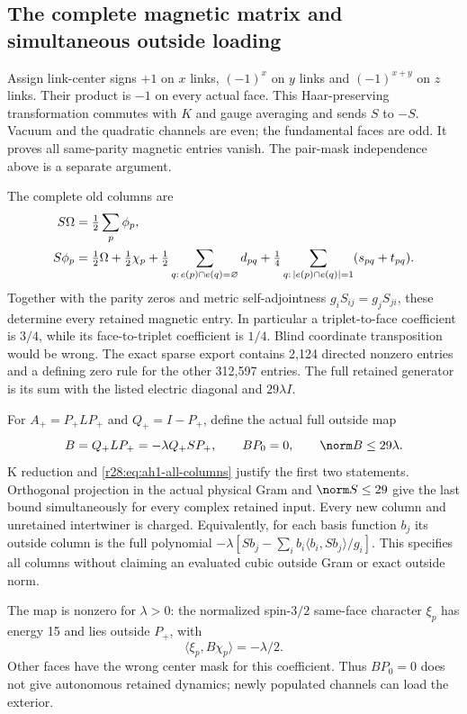 \subsection{The complete magnetic matrix and simultaneous outside loading}
Assign link-center signs $+1$ on $x$ links, $(-1)^x$ on $y$ links and $(-1)^{x+y}$ on $z$ links. Their product is $-1$ on every actual face. This Haar-preserving transformation commutes with $K$ and gauge averaging and sends $S$ to $-S$. Vacuum and the quadratic channels are even; the fundamental faces are odd. It proves all same-parity magnetic entries vanish. The pair-mask independence above is a separate argument.

The complete old columns are
\begin{align}
 S\Omega&=\tfrac12\sum_p\phi_p,\notag\\
 S\phi_p&=\tfrac12\Omega+\tfrac12\chi_p
 +\tfrac12\sum_{q:\,e(p)\cap e(q)=\varnothing}d_{pq}
 +\tfrac14\sum_{q:\,|e(p)\cap e(q)|=1}(s_{pq}+t_{pq}).
 \label{r28:eq:ah1-all-columns}
\end{align}
Together with the parity zeros and metric self-adjointness $g_iS_{ij}=g_jS_{ji}$, these determine every retained magnetic entry. In particular a triplet-to-face coefficient is $3/4$, while its face-to-triplet coefficient is $1/4$. Blind coordinate transposition would be wrong. The exact sparse export contains 2,124 directed nonzero entries and a defining zero rule for the other 312,597 entries. The full retained generator is its sum with the listed electric diagonal and $29\lambda I$.

For $A_+=P_+LP_+$ and $Q_+=I-P_+$, define the actual full outside map
\begin{equation}
 B=Q_+LP_+=-\lambda Q_+SP_+,
 \qquad BP_0=0,
 \qquad\norm B\le29\lambda.
 \label{r28:eq:ah1-outside}
\end{equation}
K reduction and \eqref{r28:eq:ah1-all-columns} justify the first two statements. Orthogonal projection in the actual physical Gram and $\norm S\le29$ give the last bound simultaneously for every complex retained input. Every new column and unretained intertwiner is charged. Equivalently, for each basis function $b_j$ its outside column is the full polynomial
$-\lambda[Sb_j-\sum_i b_i\langle b_i,Sb_j\rangle/g_i]$.
This specifies all columns without claiming an evaluated cubic outside Gram or exact outside norm.

The map is nonzero for $\lambda>0$: the normalized spin-$3/2$ same-face character $\xi_p$ has energy 15 and lies outside $P_+$, with
\begin{equation}
 \langle\xi_p,B\chi_p\rangle=-\lambda/2.
\end{equation}
Other faces have the wrong center mask for this coefficient. Thus $BP_0=0$ does not give autonomous retained dynamics; newly populated channels can load the exterior.

